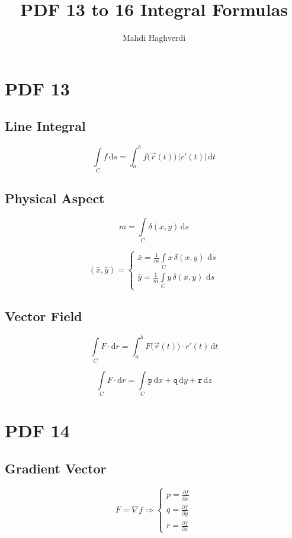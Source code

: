 \documentclass[12pt, fleqn]{book}
\title{PDF 13 to 16 Integral Formulas}
\author{Mahdi Haghverdi}
\newcommand{\D}{\mathrm{d}}
\newcommand{\ic}{\int\limits_C}
\newcommand{\xy}{(x, y)}
\newcommand{\rond}[2]{\frac{\partial #1}{\partial #2}}
\begin{document}
	\maketitle
	\tableofcontents
\chapter{PDF 13}\label{pdf13}
	\section{Line Integral}
	\begin{equation}
		\ic  f \, \D s = \int_{a}^{b} f\big(\vec{r}(t)\big) \, \lvert r'(t) \lvert \, \D t
	\end{equation}		

	\section{Physical Aspect}
		\begin{equation}
			m = \ic  \delta \xy \, \D s
		\end{equation}
		
		\begin{equation}
			(\bar{x}, \bar{y}) = 
			\begin{cases}
					\bar{x} = \frac{1}{m} \ic  x \, \delta\xy \, \, \D s \\
					\bar{y} = \frac{1}{m} \ic  y \, \delta\xy \, \, \D s
			\end{cases}
		\end{equation}
	
	\section{Vector Field}
		\begin{equation}
			\ic  F \cdot \D r = \int_{a}^{b} F\big(\vec{r}(t)\big) \cdot r'(t) \, \D t
		\end{equation}
		
		\begin{equation}
			\ic  F \cdot \D r = \ic  \mathtt{p} \, \D x + \mathtt{q} \, \D y + \mathtt{r} \, \D z
		\end{equation}    

\chapter{PDF 14}\label{pdf14}
    \section{Gradient Vector}
		\begin{equation}
			F = \nabla f \Rightarrow
			\begin{cases}
				p = \rond{f}{x} \\
				q = \rond{f}{y} \\
				r = \rond{f}{z} 
			\end{cases}
		\end{equation} 
		
\end{document}
